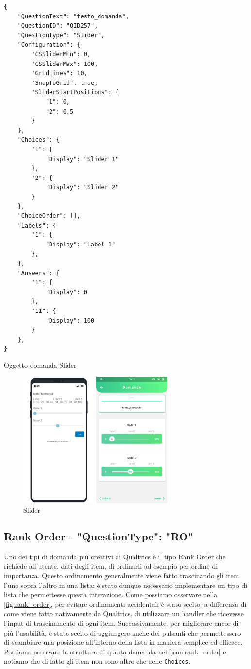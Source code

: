 \newpage
\begin{json}
\begin{verbatim}
{
    "QuestionText": "testo_domanda",
    "QuestionID": "QID257",
    "QuestionType": "Slider",
    "Configuration": {
        "CSSliderMin": 0,
        "CSSliderMax": 100,
        "GridLines": 10,
        "SnapToGrid": true,
        "SliderStartPositions": {
            "1": 0,
            "2": 0.5
        }
    },
    "Choices": {
        "1": {
            "Display": "Slider 1"
        },
        "2": {
            "Display": "Slider 2"
        }
    },
    "ChoiceOrder": [],
    "Labels": {
        "1": {
            "Display": "Label 1"
        },
    },
    "Answers": {
        "1": {
            "Display": 0
        },
        "11": {
            "Display": 100
        }
    },
}
\end{verbatim}
\caption{Oggetto domanda Slider}
\label{json:slider}
\end{json}

\begin{figure}[ht!]
\centering
\includegraphics[width=0.7\textwidth]{img/slider}
\caption{Slider}
\label{fig:slider}
\end{figure}

\clearpage
\subsection{Rank Order - "QuestionType": "RO"}
Uno dei tipi di domanda più creativi di Qualtrics è il tipo Rank Order che richiede all'utente, dati degli item, di ordinarli ad esempio per ordine di importanza. Questo ordinamento generalmente viene fatto trascinando gli item l'uno sopra l'altro in una lista: è stato dunque necessario implementare un tipo di lista che permettesse questa interazione. Come possiamo osservare nella \autoref{fig:rank_order}, per evitare ordinamenti accidentali è stato scelto, a differenza di come viene fatto nativamente da Qualtrics, di utilizzare un handler che ricevesse l'input di trascinamento di ogni item. Successivamente, per migliorare ancor di più l'usabilità, è stato scelto di aggiungere anche dei pulsanti che permettessero di scambiare una posizione all'interno della lista in maniera semplice ed efficace. Possiamo osservare la struttura di questa domanda nel \autoref{json:rank_order} e notiamo che di fatto gli item non sono altro che delle \texttt{Choices}.

